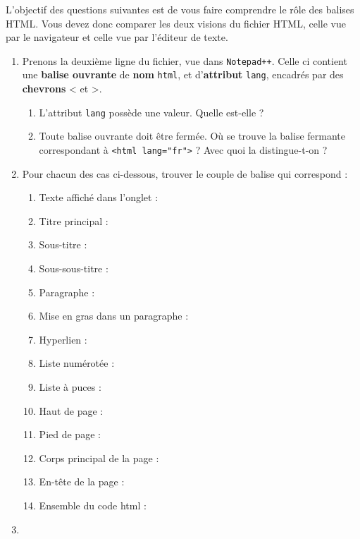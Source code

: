 \documentclass[a4paper,12pt]{article}
\begin{document}
\noindent L'objectif des questions suivantes est de vous faire comprendre le rôle des balises HTML. Vous devez donc comparer les deux visions du fichier HTML, celle vue par le navigateur et celle vue par l'éditeur de texte.
\begin{enumerate}
\item Prenons la deuxième ligne du fichier, vue dans \texttt{Notepad++}. Celle ci contient une \textbf{balise ouvrante} de \textbf{nom} \texttt{html}, et d'\textbf{attribut} \texttt{lang}, encadrés par des \textbf{chevrons} < et >.
\begin{enumerate}
\item L'attribut \texttt{lang} possède une valeur. Quelle est-elle ? 
\item Toute balise ouvrante doit être fermée. Où se trouve la balise fermante correspondant à \texttt{<html lang="fr">} ? Avec quoi la distingue-t-on ? 
\end{enumerate}
\item Pour chacun des cas ci-dessous, trouver le couple de balise qui correspond :
\begin{enumerate}
\item Texte affiché dans l'onglet : 
\item Titre principal : 
\item Sous-titre : 
\item Sous-sous-titre : 
\item Paragraphe : 
\item Mise en gras dans un paragraphe : 
\item Hyperlien :  
\item Liste numérotée : 
\item Liste à puces : 
\item Haut de page : 
\item Pied de page : 
\item Corps principal de la page : 
\item En-tête de la page : 
\item Ensemble du code html : 
\end{enumerate}
\item \begin{enumerate}

\end{enumerate}
\end{enumerate}
\end{document}
